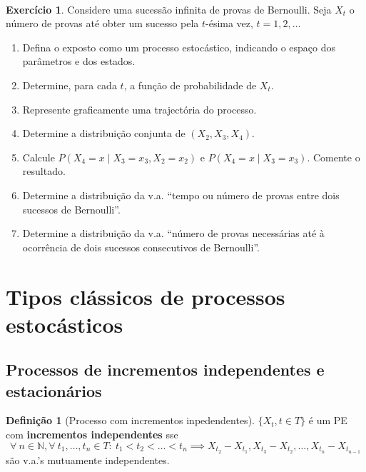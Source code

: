 \documentclass[
  11pt,
  a4paper,
]{book}
\theoremstyle{definition}
\newtheorem{definition}{Definição}[chapter]
\theoremstyle{definition}
\theoremstyle{definition}
\newtheorem{exercise}{Exercício}[chapter]
\theoremstyle{definition}
\theoremstyle{remark}
\begin{document}
\(\,\)

\begin{exercise}
\leavevmode

Considere uma sucessão infinita de provas de Bernoulli. Seja
\(X_{t}\) o número de provas até obter um sucesso pela \(t\)-ésima
vez, \(t = 1, 2, \ldots\)

\begin{enumerate}
\def\labelenumi{(\alph{enumi})}
\item
  Defina o exposto como um processo estocástico, indicando o espaço dos parâmetros e dos estados.
\item
  Determine, para cada \(t\), a função de probabilidade de \(X_{t}\).
\item
  Represente graficamente uma trajectória do processo.
\item
  Determine a distribuição conjunta de \((X_{2}, X_{3}, X_{4})\).
\item
  Calcule \(P(X_{4} = x \mid X_{3} = x_{3}, X_{2} = x_{2})\) e \(P(X_{4} = x \mid X_{3} = x_{3})\). Comente o resultado.
\item
  Determine a distribuição da v.a. ``tempo ou número de provas entre dois sucessos de Bernoulli''.
\item
  Determine a distribuição da v.a. ``número de provas necessárias até à ocorrência de dois sucessos consecutivos de Bernoulli''.
\end{enumerate}

\end{exercise}

\section{Tipos clássicos de processos estocásticos}\label{tipos-classicos-de-processos-estocasticos}

\subsection{Processos de incrementos independentes e estacionários}\label{processos-de-incrementos-independentes-e-estacionarios}

\begin{definition}[Processo com incrementos inpedendentes]
\(\{X_t, t \in T\}\) é um PE com \textbf{incrementos independentes} sse
\[\forall ~n \in \mathbb{N}, \forall ~t_1, \ldots,t_n \in T: ~t_1 <t_2<\ldots<t_n \implies X_{t_2}-X_{t_1}, X_{t_3}-X_{t_2},\ldots,X_{t_n}-X_{t_{n-1}}\]
são v.a.'s mutuamente independentes.
\end{definition}
\end{document}
